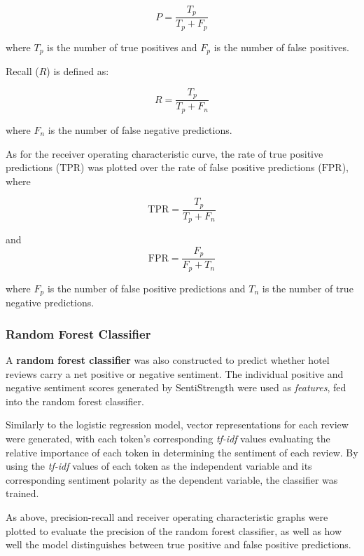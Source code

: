 \documentclass[12pt, bibliography=totocnumbered, paper=a4]{scrartcl}
\def\bf#1{\textbf{#1}}
\def\it#1{\textit{#1}}
\begin{document}
\begin{equation}
	P = \frac{T_p}{T_p + F_p}
	\label{eq:prec}
\end{equation}

where $T_p$ is the number of true positives and $F_p$ is the number of false positives.

Recall ($R$) is defined as:

\begin{equation}
	R = \frac{T_p}{T_p + F_n}
	\label{eq:recall}
\end{equation}

where $F_n$ is the number of false negative predictions.

As for the receiver operating characteristic curve, the rate 
of true positive predictions ($\text{TPR}$) was plotted over the rate of 
false positive predictions ($\text{FPR}$), where

\begin{equation}
	\text{TPR} = \frac{T_p}{T_p + F_n}
	\label{eq:TPR}
\end{equation}

and 
\begin{equation}
	\text{FPR} = \frac{F_p}{F_p + T_n}
	\label{eq:FPR}
\end{equation}

where $F_p$ is the number of false positive predictions
and $T_n$ is the number of true negative predictions.

\subsubsection{Random Forest Classifier}
A \bf{random forest classifier} was also constructed
to predict whether hotel reviews carry a net positive or
negative sentiment. The individual positive and negative sentiment
scores generated by SentiStrength were used as \it{features},
fed into the random forest classifier.

Similarly to the logistic regression model,
vector representations for each review were generated,
with each token's corresponding \it{tf-idf} values evaluating the
relative importance of each token in determining the sentiment
of each review. By using the \it{tf-idf} values of each token as
the independent variable and its corresponding sentiment polarity
as the dependent variable, the classifier was trained.

As above, precision-recall and receiver operating characteristic
graphs were plotted to evaluate the precision of the random forest
classifier, as well as how well the model distinguishes between true
positive and false positive predictions.
\end{document}
